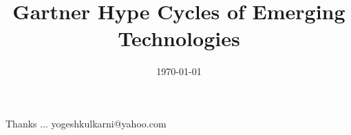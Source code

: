 \documentclass[xcolor=dvipsnames,compress,t,pdf]{beamer}
\title[Zen Habits \hspace{4cm} \insertframenumber /\inserttotalframenumber]
{Gartner Hype Cycles of Emerging Technologies}
\subtitle[]{}
\date[2014]{\today}
\begin{document}
\begin{frame}
\titlepage
\end{frame}




\begin{frame}[c]{}
Thanks ...
\vspace{5mm}
yogeshkulkarni@yahoo.com
\end{frame}
\end{document}
